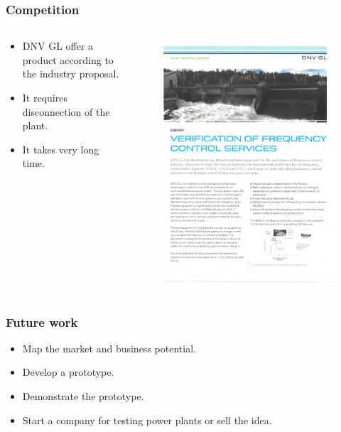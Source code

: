 \begin{frame}
		\frametitle{Competition}
		\begin{columns}
				\begin{column}{0.4\textwidth}
						\begin{itemize}
								\item DNV GL offer a product according to the industry proposal.
								\item It requires disconnection of the plant.
								\item It takes very long time.
						\end{itemize}
				\end{column}
				\begin{column}{0.6\textwidth}
						\begin{figure}
								\includegraphics[width=\textwidth]{./pictures/DNV}
						\end{figure}
				\end{column}
		\end{columns}
\end{frame}
\begin{frame}
	\frametitle{Future work}
	\begin{itemize}
			\item Map the market and business potential.
			\item Develop a prototype.
			\item Demonstrate the prototype.
			\item Start a company for testing power plants or sell the idea.
	\end{itemize}
	\end{frame}
